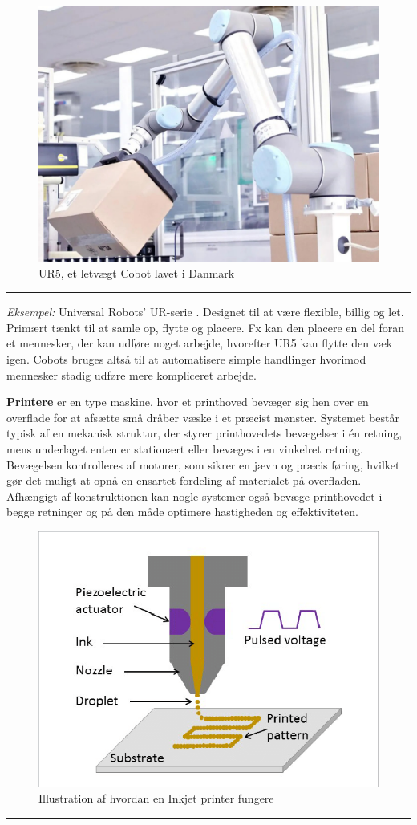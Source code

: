 \begin{figure}[H]
    \centering
    \includegraphics[width=0.5\linewidth]{Sections/2 Problemanalyse/Media/URrobot.jpg}
    \caption{UR5, et letvægt Cobot lavet i Danmark \parencite{2023URSeries}}
    \label{fig:ur5pic}
\end{figure} \plainbreak{-0.5}

\textit{Eksempel:} Universal Robots' UR-serie \parencite{2023URSeries}. Designet til at være flexible, billig og let. Primært tænkt til at samle op, flytte og placere. Fx kan den placere en del foran et mennesker, der kan udføre noget arbejde, hvorefter UR5 kan flytte den væk igen. Cobots bruges altså til at automatisere simple handlinger hvorimod mennesker stadig udføre mere kompliceret arbejde.

\textbf{Printere} er en type maskine, hvor et printhoved bevæger sig hen over en overflade for at afsætte små dråber væske i et præcist mønster. Systemet består typisk af en mekanisk struktur, der styrer printhovedets bevægelser i én retning, mens underlaget enten er stationært eller bevæges i en vinkelret retning. Bevægelsen kontrolleres af motorer, som sikrer en jævn og præcis føring, hvilket gør det muligt at opnå en ensartet fordeling af materialet på overfladen. Afhængigt af konstruktionen kan nogle systemer også bevæge printhovedet i begge retninger og på den måde optimere hastigheden og effektiviteten.\parencite{Delaney2009InkjetProteins} 

\begin{figure}[H]
    \centering
    \includegraphics[width=0.5\linewidth]{Sections/2 Problemanalyse/Media/inkjet.png}
    \caption{Illustration af hvordan en Inkjet printer fungere \parencite{Long2025AOptimizations}}
    \label{fig: Inkjet}
\end{figure} \plainbreak{-0.5}

